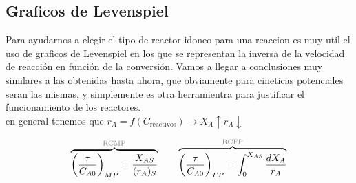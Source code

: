 \subsection{Graficos de Levenspiel}
\begin{flushleft}
    Para ayudarnos a elegir el tipo de reactor idoneo para una reaccion es muy util el uso de graficos de Levenspiel en los que se representan la inversa de la velocidad de reacción en función de la conversión. Vamos a llegar a conclusiones muy similares a las obtenidas hasta ahora, que obviamente para cineticas potenciales seran las mismas, y simplemente es otra herramientra para justificar el funcionamiento de los reactores.\\
    \vspace{0.5em}
    en general tenemos que $r_A = f(C_{\text{reactivos}}) \rightarrow X_A\uparrow r_A\downarrow$
\end{flushleft}

\begin{equation}
    \overbrace{\left( \frac{\tau}{C_{A0}} \right)_{MP} = \frac{X_{AS}}{(r_A)_S}}^{\textcolor{gray}{\text{RCMP}}} \quad \quad \overbrace{\left( \frac{\tau}{C_{A0}} \right)_{FP} = \int_{0}^{X_{AS}} \frac{dX_A}{r_A}}^{\textcolor{gray}{\text{RCFP}}}
\end{equation}
\newpage
